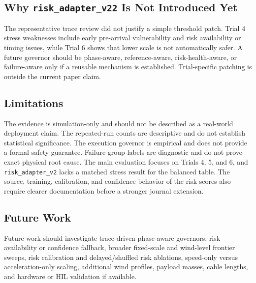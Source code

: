 \subsection{Why \texttt{risk\_adapter\_v22} Is Not Introduced Yet}

The representative trace review did not justify a simple threshold patch.
Trial 4 stress weaknesses include early pre-arrival vulnerability and risk
availability or timing issues, while Trial 6 shows that lower scale is not
automatically safer. A future governor should be phase-aware, reference-aware,
risk-health-aware, or failure-aware only if a reusable mechanism is
established. Trial-specific patching is outside the current paper claim.

\subsection{Limitations}

The evidence is simulation-only and should not be described as a real-world
deployment claim. The repeated-run counts are descriptive and do not establish
statistical significance. The execution governor is empirical and does not
provide a formal safety guarantee. Failure-group labels are diagnostic and do
not prove exact physical root cause. The main evaluation focuses on Trials 4,
5, and 6, and \texttt{risk\_adapter\_v2} lacks a matched stress result for the
balanced table. The source, training, calibration, and confidence behavior of
the risk scores also require clearer documentation before a stronger journal
extension.

\subsection{Future Work}

Future work should investigate trace-driven phase-aware governors, risk
availability or confidence fallback, broader fixed-scale and wind-level
frontier sweeps, risk calibration and delayed/shuffled risk ablations,
speed-only versus acceleration-only scaling, additional wind profiles, payload
masses, cable lengths, and hardware or HIL validation if available.
